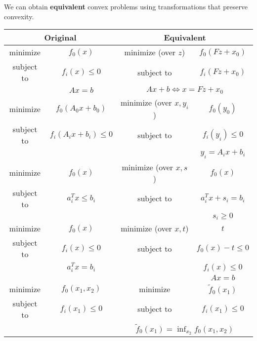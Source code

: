 We can obtain \textbf{equivalent} convex problems using transformations that preserve convexity.

\begin{center}
    \begin{tabular}{|cc|cc|}
        \hline
        \multicolumn{2}{|c|}{Original} & \multicolumn{2}{|c|}{Equivalent} \\
        \hline
        minimize & $f_0(x)$ & minimize (over $z$) & $f_0(Fz+x_0)$ \\
        subject to& $f_i(x)\leq 0$ & subject to & $f_i(Fz+x_0)$ \\
        & $Ax=b$ & \multicolumn{2}{c|}{$Ax+b \iff x=Fz+x_0$}\\
        \hline
        minimize & $f_0(A_0x+b_0)$ & minimize (over $x,y_i$) & $f_0(y_0)$ \\
        subject to& $f_i(A_ix+b_i)\leq 0$ & subject to & $f_i(y_i)\leq 0$ \\
        & & & $y_i=A_ix+b_i$ \\
        \hline
        minimize & $f_0(x)$ & minimize (over $x,s$) & $f_0(x)$ \\
        subject to& $a_i^Tx\leq b_i$ & subject to & $a_i^Tx+s_i=b_i$ \\
        & & & $s_i\geq0$ \\
        \hline
        minimize & $f_0(x)$ & minimize (over $x,t$) & $t$ \\
        subject to& $f_i(x)\leq0$ & subject to & $f_0(x)-t\leq0$ \\
        & $a_i^Tx=b_i$ & & $f_i(x)\leq0$ \\
        & & & $Ax=b$ \\
        \hline
        minimize & $f_0(x_1,x_2)$ & minimize & $\tilde{f}_0(x_1)$ \\
        subject to& $f_i(x_1)\leq0$ & subject to & $f_i(x_1)\leq0$ \\
        & & \multicolumn{2}{c|}{$\tilde{f}_0(x_1)=\inf_{x_2}{f_0(x_1,x_2)}$}\\
        \hline
    \end{tabular}
\end{center}
%